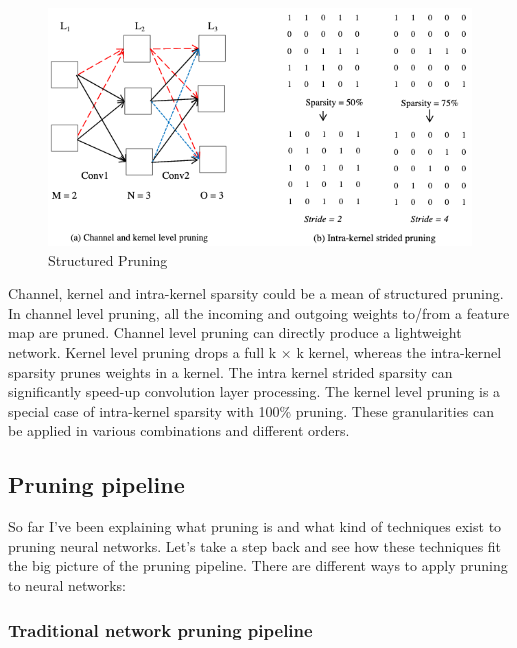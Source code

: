 \begin{figure}[ht]
    \includegraphics[width=\textwidth]{images/pruning/structured_pruning.png}
    \centering
    \caption{Structured Pruning}\label{fig:structured_pruning}
\end{figure}

Channel, kernel and intra-kernel sparsity could be a mean of structured
pruning. In channel level pruning, all the incoming and outgoing weights
to/from a feature map are pruned. Channel level pruning can directly produce a
lightweight network.
Kernel level pruning drops a full k × k kernel, whereas the intra-kernel
sparsity prunes weights in a kernel. The intra kernel strided sparsity can
significantly speed-up convolution layer processing.
The kernel level pruning is a special case of intra-kernel sparsity with
100\% pruning. These granularities can be applied in various combinations and
different orders.\cite{Anwar_2017}

\subsection{Pruning pipeline}
So far I've been explaining what pruning is and what kind of techniques exist
to pruning neural networks. Let's take a step back and see how these techniques
fit the big picture of the pruning pipeline.
There are different ways to apply pruning to neural networks:

\subsubsection{Traditional network pruning pipeline}

